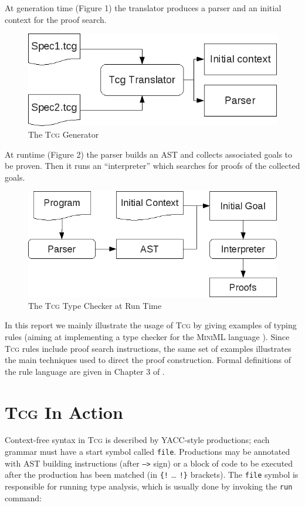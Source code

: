 \documentclass[a4paper,12pt]{article}
\newcommand{\Tcg}{\textsc{Tcg}}
\newcommand{\code}[1]{\texttt{#1}}
\begin{document}
At generation time (Figure 1) the translator produces a parser and an initial context for the proof search.

\begin{figure}[htp]
\centering
\includegraphics[width=.7\textwidth]{generator.png}
\caption{The \Tcg{} Generator}
\end{figure}

At runtime (Figure 2) the parser builds an AST and collects associated goals to be proven. Then it runs an ``interpreter'' which searches for proofs of the collected goals.

\begin{figure}[htp]
\centering
\includegraphics[width=.7\textwidth]{runtime.png}
\caption{The \Tcg{} Type Checker at Run Time}
\end{figure}

In this report we mainly illustrate the usage of \Tcg{} by giving examples of typing rules (aiming at implementing a type checker for the \textsc{MiniML} language \cite{MiniML}).
Since \Tcg{} rules include proof search instructions, the same set of examples illustrates the main techniques used to direct the proof construction. Formal definitions of the rule language are given in Chapter 3 of \cite{Tcg}.


\section{\Tcg{} In Action}

Context-free syntax in \Tcg{} is described by YACC-style productions; each grammar must have a start symbol called \code{file}. Productions may be annotated with AST building instructions (after \code{-->} sign) or a block of code to be executed after the production has been matched (in \code{\{!} \ldots{} \code{!\}} brackets). The \code{file} symbol is responsible for running type analysis, which is usually done by invoking the \code{run} command:
\end{document}
